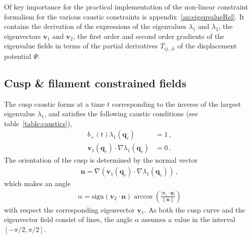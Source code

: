 \documentclass[a4paper, 11pt]{article}
\begin{document}
\bigskip
Of key importance for the practical implementation of the non-linear constraint formalism for the various caustic constraints is appendix~\ref{ap:eigenvalueRel}. It contains the derivation of the expressions of the eigenvalues $\lambda_1$ and $\lambda_2$, the eigenvectors $\bm{v}_1$ and $\bm{v}_2$, the first order and second order gradients of the eigenvalue fields in terms of the partial derivatives $T_{ij \dots k}$ of the displacement potential $\Psi$. 

\subsection{Cusp \& filament constrained fields}
The cusp caustic forms at a time $t$ corresponding to the inverse of the largest eigenvalue $\lambda_1$, and satisfies the following caustic conditions (see table~\ref{table:caustics}),
\begin{align}
b_+(t) \lambda_1(\bm{q}_c) &= 1\,, \\
 \bm{v}_1(\bm{q}_c) \cdot \nabla\lambda_1(\bm{q}_c) &= 0\,.
\end{align}
The orientation of the cusp is determined by the normal vector
\begin{align}
\bm{n} =  \nabla(\bm{v}_1(\bm{q}_c) \cdot \nabla\lambda_1(\bm{q}_c))\,,
\end{align}
which makes an angle 
\begin{align}
\alpha = \text{sign}(\bm{v}_2\cdot \bm{n}) \arccos\left(\frac{|\bm{v}_1\cdot \bm{n}|}{\|\bm{n}\|}\right)
\end{align}
with respect the corresponding eigenvector $\bm{v}_1$. As both the cusp curve and the eigenvector field consist of lines, the angle $\alpha$ assumes a value in the interval $[-\pi/2,\pi/2]$. 
\end{document}
